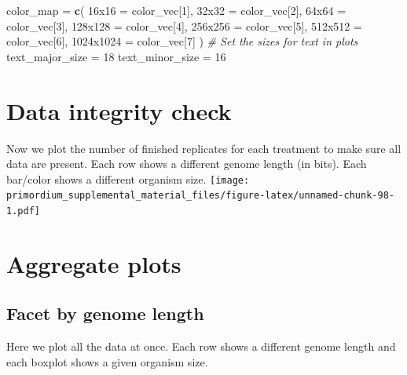 \documentclass[
]{book}
\newenvironment{Shaded}{\begin{snugshade}}{\end{snugshade}}
\newcommand{\CommentTok}[1]{\textcolor[rgb]{0.56,0.35,0.01}{\textit{#1}}}
\newcommand{\DecValTok}[1]{\textcolor[rgb]{0.00,0.00,0.81}{#1}}
\newcommand{\KeywordTok}[1]{\textcolor[rgb]{0.13,0.29,0.53}{\textbf{#1}}}
\newcommand{\NormalTok}[1]{#1}
\newcommand{\StringTok}[1]{\textcolor[rgb]{0.31,0.60,0.02}{#1}}
\begin{document}
\begin{Shaded}
\begin{Highlighting}[]
\NormalTok{color\_map =}\StringTok{ }\KeywordTok{c}\NormalTok{(}
  \StringTok{\textquotesingle{}16x16\textquotesingle{}}\NormalTok{ =}\StringTok{     }\NormalTok{color\_vec[}\DecValTok{1}\NormalTok{],}
  \StringTok{\textquotesingle{}32x32\textquotesingle{}}\NormalTok{ =}\StringTok{     }\NormalTok{color\_vec[}\DecValTok{2}\NormalTok{],}
  \StringTok{\textquotesingle{}64x64\textquotesingle{}}\NormalTok{ =}\StringTok{     }\NormalTok{color\_vec[}\DecValTok{3}\NormalTok{],}
  \StringTok{\textquotesingle{}128x128\textquotesingle{}}\NormalTok{ =}\StringTok{   }\NormalTok{color\_vec[}\DecValTok{4}\NormalTok{],}
  \StringTok{\textquotesingle{}256x256\textquotesingle{}}\NormalTok{ =}\StringTok{   }\NormalTok{color\_vec[}\DecValTok{5}\NormalTok{],}
  \StringTok{\textquotesingle{}512x512\textquotesingle{}}\NormalTok{ =}\StringTok{   }\NormalTok{color\_vec[}\DecValTok{6}\NormalTok{],}
  \StringTok{\textquotesingle{}1024x1024\textquotesingle{}}\NormalTok{ =}\StringTok{ }\NormalTok{color\_vec[}\DecValTok{7}\NormalTok{]}
\NormalTok{)}
\CommentTok{\# Set the sizes for text in plots}
\NormalTok{text\_major\_size =}\StringTok{ }\DecValTok{18}
\NormalTok{text\_minor\_size =}\StringTok{ }\DecValTok{16} 
\end{Highlighting}
\end{Shaded}

\hypertarget{data-integrity-check-6}{%
\section{Data integrity check}\label{data-integrity-check-6}}

Now we plot the number of finished replicates for each treatment to make sure all data are present.
Each row shows a different genome length (in bits).
Each bar/color shows a different organism size.
\texttt{[image: primordium\_supplemental\_material\_files/figure-latex/unnamed-chunk-98-1.pdf]}

\hypertarget{aggregate-plots-4}{%
\section{Aggregate plots}\label{aggregate-plots-4}}

\hypertarget{facet-by-genome-length-1}{%
\subsection{Facet by genome length}\label{facet-by-genome-length-1}}

Here we plot all the data at once.
Each row shows a different genome length and each boxplot shows a given organism size.
\end{document}
